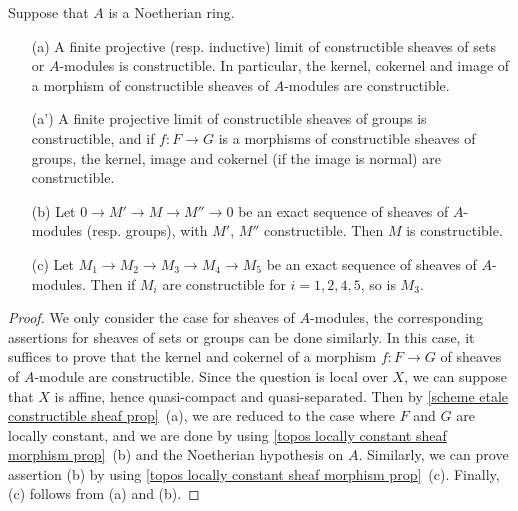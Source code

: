 \begin{proposition}\label{scheme etale constructible sheaf category prop}
Suppose that $A$ is a Noetherian ring.
\begin{enumerate}
    \item[(a)] A finite projective (resp. inductive) limit of constructible sheaves of sets or $A$-modules is constructible. In particular, the kernel, cokernel and image of a morphism of constructible sheaves of $A$-modules are constructible.
    \item[(a')] A finite projective limit of constructible sheaves of groups is constructible, and if $f:F\to G$ is a morphisms of constructible sheaves of groups, the kernel, image and cokernel (if the image is normal) are constructible.
    \item[(b)] Let $0\to M'\to M\to M''\to 0$ be an exact sequence of sheaves of $A$-modules (resp. groups), with $M'$, $M''$ constructible. Then $M$ is constructible.
    \item[(c)] Let $M_1\to M_2\to M_3\to M_4\to M_5$ be an exact sequence of sheaves of $A$-modules. Then if $M_i$ are constructible for $i=1,2,4,5$, so is $M_3$.
\end{enumerate}
\end{proposition}
\begin{proof}
We only consider the case for sheaves of $A$-modules, the corresponding assertions for sheaves of sets or groups can be done similarly. In this case, it suffices to prove that the kernel and cokernel of a morphism $f:F\to G$ of sheaves of $A$-module are constructible. Since the question is local over $X$, we can suppose that $X$ is affine, hence quasi-compact and quasi-separated. Then by \cref{scheme etale constructible sheaf prop}~(a), we are reduced to the case where $F$ and $G$ are locally constant, and we are done by using \cref{topos locally constant sheaf morphism prop}~(b) and the Noetherian hypothesis on $A$. Similarly, we can prove assertion (b) by using \cref{topos locally constant sheaf morphism prop}~(c). Finally, (c) follows from (a) and (b).
\end{proof}


